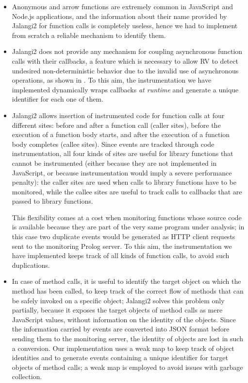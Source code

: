 \begin{itemize}
\item Anonymous and arrow functions are extremely common in JavaScript and Node.js applications, and the information about their name
  provided by Jalangi2 for function calls is completely  useless, hence we had to implement from scratch a reliable mechanism to identify them.
\item Jalangi2 does not provide any mechanism for coupling asynchronous function calls with their callbacks, a feature which is
  necessary to allow RV to detect undesired non-deterministic behavior due to the invalid use of asynchronous operations, as shown in
  . %
To this aim, the instrumentation we have implemented dynamically wraps callbacks \emph{at runtime} and generate a unique identifier for each one of them.
\item Jalangi2 allows insertion of instrumented code for function calls at four different sites: before and after a function call (caller sites),
  before the execution of a function body starts, and after the execution of a function body completes (callee sites). Since
  events are tracked through code instrumentation, all four kinds of sites are useful for library functions that cannot be
  instrumented (either because they are not implemented in JavaScript, or because instrumentation would imply a severe performance penalty):  the caller sites
  are used when calls to library functions have to be monitored, while the callee sites are useful to track calls to callbacks that are passed to
  library functions.

  This flexibility comes at a cost when monitoring functions whose source code is available because they are part of the very same program under analysis; in this case two duplicate events would be generated as HTTP client requests sent to the monitoring Prolog server. To this aim,
  the instrumentation we have implemented keeps track of all kinds of function calls, to avoid such duplications.

\item In case of method calls, it is useful to identify the target object on which the method has been called, to keep track of the correct
  flow of methods that can be safely invoked on a specific object; Jalangi2 solves this problem only partially,
  because it exposes  the target objects of method calls as mere JavaScript values, without information on the identity of the objects.
  Since the information carried by events are converted into JSON format before sending them to the monitoring server, the identity of objects are lost
  in such a conversion. Our implementation uses a weak map to keep track of object identities and to generate events containing a unique identifier
  for target objects of method calls; a weak map is employed to avoid issues with garbage collection.


\end{itemize}
